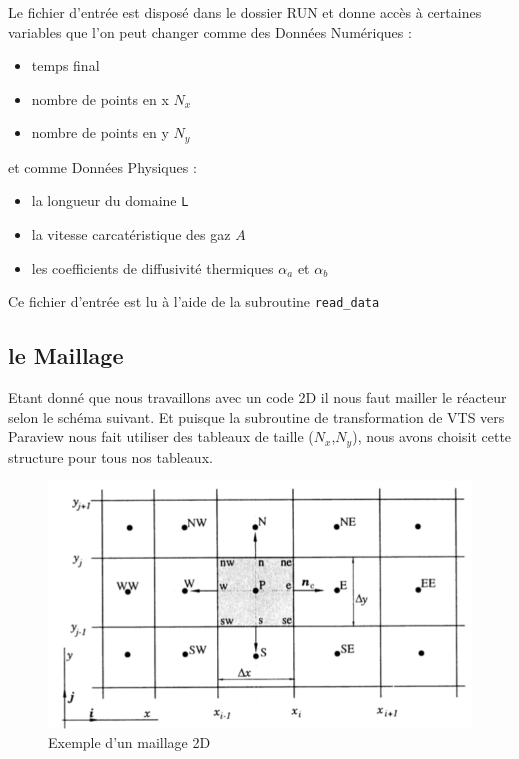 \documentclass[a4paper,oneside]{article}
\makeatletter
\def\bigcenter{\trivlist \bigcentering\item\relax}
\def\bigcentering{\let\\\@centercr\rightskip\@bigflushglue%
\leftskip\@bigflushglue
\parindent\z@\parfillskip\z@skip}
\makeatother
\begin{document}
Le fichier d'entrée est disposé dans le dossier RUN et donne accès à certaines variables que l'on peut changer comme des Données Numériques :
\begin{itemize}
	\item temps final
	\item nombre de points en x $N_x$
	\item nombre de points en y $N_y$
\end{itemize}

et comme Données Physiques :
\begin{itemize}
	\item la longueur du domaine \verb?L?
	\item la vitesse carcatéristique des gaz $A$
	\item les coefficients de diffusivité thermiques $\alpha_a$ et $\alpha_b$
\end{itemize}

Ce fichier d'entrée est lu à l'aide de la subroutine \verb?read_data?



\subsection{le Maillage}
Etant donné que nous travaillons avec un code 2D il nous faut mailler le réacteur selon le schéma suivant.
Et puisque la subroutine de transformation de VTS vers Paraview nous fait utiliser des tableaux de taille ($N_x$,$N_y$), nous avons choisit cette structure pour tous nos tableaux.

\begin{figure}[h!]
\bigcenter
\includegraphics[scale=0.5]{Champ_Vitesse_Maillage/MaillageTheorique.PNG}
\caption{Exemple d'un maillage 2D}
\end{figure}
\end{document}
